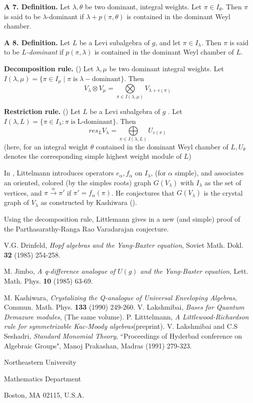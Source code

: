 \medskip
\noindent
{\bfseries A 7. Definition.}\label{A. 7. Definition.} Let $\lambda, \theta$ be two dominant, integral weights. Let $\pi \in I_{\theta}$. Then $\pi$ is said to be $\lambda$-dominant if $\lambda + p(\pi, \theta)$ is contained in the dominant Weyl chamber.

\medskip
\noindent
{\bfseries A 8. Definition.}\label{A. 8. Definition.} Let $L$ be a Levi subalgebra of $g$, and let $\pi \in I_{\lambda}$.  Then $\pi$ is said to be \textit{$L$-dominant} if $p(\pi, \lambda)$ is contained in the dominant Weyl chamber of $L$. 


\medskip
\noindent
{\bfseries Decomposition rule.} (\cite{art10-keyLi}) Let $\lambda, \mu$ be two dominant integral weights. Let $I(\lambda, \mu) = \{\pi \in I_{\mu} \; | \; \pi\; \text{is}\; \lambda-\text{dominant}\}$. Then
$$
V_{\lambda} \otimes V_{\mu} = \bigotimes\limits_{\pi \in I(\lambda, \mu)}V_{\lambda +v(\pi)}
$$

\medskip
\noindent
{\bfseries Restriction rule.} (\cite{art10-keyLi}) Let $L$ be a  Levi subalgebra of $g$ . Let $ I(\lambda, L) = \{\pi \in I_{\lambda}: \pi \; \text{is}\; \text{L-dominant}\}$. Then
$$
res_{L}V_{\lambda} = \bigoplus\limits_{\pi \in I(\lambda, L)}U_{v(\pi)}
$$
(here, for an integral weight $\theta$ contained in the dominant Weyl chamber of $L, U_{\theta}$ denotes the corresponding simple highest weight module of $L$)

In \cite{art10-keyLi}, Littelmann introduces operators $e_{\alpha}, f_{\alpha}$ on $I_{\lambda}$, (for $\alpha$ simple), and associates an oriented, colored (by the simples roots) graph $G(V_{\lambda})$ with $I_{\lambda}$ as the set of vertices, and $\pi \xrightarrow{\alpha} \pi'$ if $\pi' =f_{\alpha}(\pi)$. He conjectures that $ G(V_{\lambda})$ is  the crystal graph of $V_{\lambda}$ as constructed by Kashiwara (\cite{art10-keyK}). 

Using the decomposition rule, Littlemann gives in \cite{art10-keyLi} a new (and simple) proof of the Parthasarathy-Ranga Rao Varadarajan conjecture.

\begin{thebibliography}{99}
 V.G. Drinfeld, \textit{Hopf algebras and the Yang-Baxter equation}, Soviet Math. Dokl. {\bf 32} (1985) 254-258.

 M. Jimbo, \textit{A q-difference analogue of $U(g)$ and the Yang-Baster equation}, Lett. Math. Phys. {\bf 10} (1985) 63-69.

 M. Kashiwara, \textit{Crystalizing the Q-analogue of Universal Enveloping Algebras}, Commun. Math. Phys. {\bf 133} (1990) 249-260.
V. Lakshmibai, \textit{Bases for Quantum Demazure modules}, (The same volume).
 P. Litttelmann, \textit{A Littlewood-Richardson rule for symmetrizable Kac-Moody algebras}(preprint).
 V. Lakshmibai and C.S Seshadri, \textit{Standard Monomial Theory}, ``Proceedings of Hyderbad conference on Algebraic Groups", Manoj Prakashan, Madras (1991) 279-323.
\end{thebibliography}

\begin{flushleft}
Northeastern University

Mathematics Department

Boston, MA 02115, U.S.A.
\end{flushleft}
